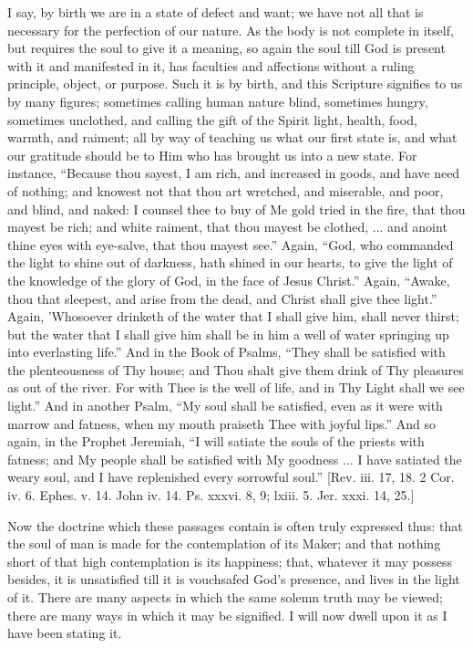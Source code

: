I say, by birth we are in a state of defect and want; we have not
all that is necessary for the perfection of our nature. As the body is
not complete in itself, but requires the soul to give it a meaning, so
again the soul till God is present with it and manifested in it, has
faculties and affections without a ruling principle, object, or
purpose. Such it is by birth, and this Scripture signifies to us by
many figures; sometimes calling human nature blind, sometimes hungry,
sometimes unclothed, and calling the gift of the Spirit light, health,
food, warmth, and raiment; all by way of teaching us what our first
state is, and what our gratitude should be to Him who has brought us
into a new state. For instance, ``Because thou sayest, I am rich,
and increased in goods, and have need of nothing; and knowest not that
thou art wretched, and miserable, and poor, and blind, and naked: I
counsel thee to buy of Me gold tried in the fire, that thou mayest be
rich; and white raiment, that thou mayest be clothed, ... and anoint
thine eyes with eye-salve, that thou mayest see.'' Again,
``God, who commanded the light to shine out of darkness, hath
shined in our hearts, to give the light of the knowledge of the glory
of God, in the face of Jesus Christ.'' Again, ``Awake, thou
that sleepest, and arise from the dead, and Christ shall give thee
light.'' Again, 'Whosoever drinketh of the water that I shall give
him, shall never thirst; but the water that I shall give him shall be
in him a well of water springing up into everlasting life.'' And
in the Book of Psalms, ``They shall be satisfied with the
plenteousness of Thy house; and Thou shalt give them drink of Thy
pleasures as out of the river. For with Thee is the well of life, and
in Thy Light shall we see light.'' And in another Psalm, ``My
soul shall be satisfied, even as it were with marrow and fatness, when
my mouth praiseth Thee with joyful lips.'' And so again, in the
Prophet Jeremiah, ``I will satiate the souls of the priests with
fatness; and My people shall be satisfied with My goodness ... I have
satiated the weary soul, and I have replenished every sorrowful
soul.'' [Rev. iii. 17, 18. 2 Cor. iv. 6. Ephes. v. 14. John iv.
14. Ps. xxxvi. 8, 9; lxiii. 5. Jer. xxxi. 14, 25.]

Now the doctrine which these passages contain is often truly
expressed thus: that the soul of man is made for the contemplation of
its Maker; and that nothing short of that high contemplation is its
happiness; that, whatever it may possess besides, it is unsatisfied
till it is vouchsafed God's presence, and lives in the light of it.
There are many aspects in which the same solemn truth may be viewed;
there are many ways in which it may be signified. I will now dwell
upon it as I have been stating it.

